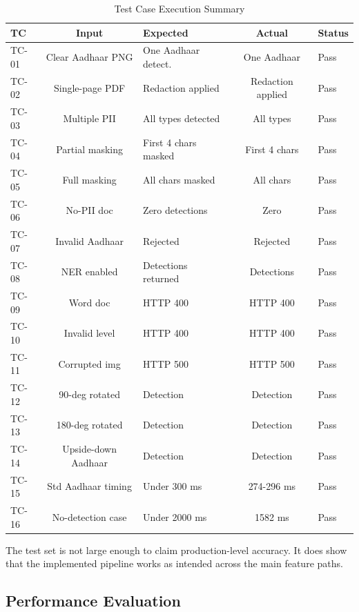 \begin{table}[htbp]
\caption{Test Case Execution Summary}
\label{tab:test_cases}
\centering
\begin{tabular}{|l|c|l|c|p{2cm}|}
\hline
\textbf{TC} & \textbf{Input} & \textbf{Expected} & \textbf{Actual} & \textbf{Status} \\
\hline
TC-01 & Clear Aadhaar PNG & One Aadhaar detect. & One Aadhaar & Pass \\
\hline
TC-02 & Single-page PDF & Redaction applied & Redaction applied & Pass \\
\hline
TC-03 & Multiple PII & All types detected & All types & Pass \\
\hline
TC-04 & Partial masking & First 4 chars masked & First 4 chars & Pass \\
\hline
TC-05 & Full masking & All chars masked & All chars & Pass \\
\hline
TC-06 & No-PII doc & Zero detections & Zero & Pass \\
\hline
TC-07 & Invalid Aadhaar & Rejected & Rejected & Pass \\
\hline
TC-08 & NER enabled & Detections returned & Detections & Pass \\
\hline
TC-09 & Word doc & HTTP 400 & HTTP 400 & Pass \\
\hline
TC-10 & Invalid level & HTTP 400 & HTTP 400 & Pass \\
\hline
TC-11 & Corrupted img & HTTP 500 & HTTP 500 & Pass \\
\hline
TC-12 & 90-deg rotated & Detection & Detection & Pass \\
\hline
TC-13 & 180-deg rotated & Detection & Detection & Pass \\
\hline
TC-14 & Upside-down Aadhaar & Detection & Detection & Pass \\
\hline
TC-15 & Std Aadhaar timing & Under 300 ms & 274-296 ms & Pass \\
\hline
TC-16 & No-detection case & Under 2000 ms & 1582 ms & Pass \\
\hline
\end{tabular}
\end{table}

The test set is not large enough to claim production-level accuracy. It does show that the implemented pipeline works as intended across the main feature paths.

\subsection{Performance Evaluation}

